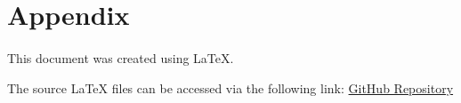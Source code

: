 
\section*{Appendix}
\paragraph{}

This document was created using \LaTeX{}.

The source \LaTeX{} files can be accessed via the following link:
\href{https://github.com/bakievelbek/project-thesis}{GitHub Repository}
